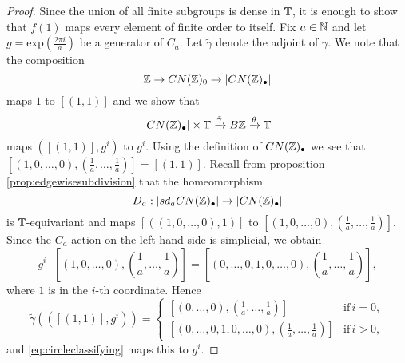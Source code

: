 \begin{proof}
Since the union of all finite subgroups is dense in $\mathbb{T}$, it is enough to
show that $f(1)$ maps every element of finite order to itself. Fix $a\in \mathbb{N}$
and let $g = \mathrm{exp}(\frac{2\pi i}{a} )$ be a generator of $C_a$. 
Let $\tilde \gamma$ denote the adjoint of $\gamma$. We 
note that the composition
\[\mathbb{Z}\to CN(\mathbb{Z})_0\to |CN(\mathbb{Z})_\bullet|
\]
 maps $1$ to $[(1,1)]$
and we show that
\[
|CN(\mathbb{Z})_\bullet|\times \mathbb{T}\xrightarrow{\tilde \gamma} B\mathbb{Z}\xrightarrow{\theta} \mathbb{T}
\]
maps $([(1,1)], g^i)$ to $g^i$.
Using the definition
of $CN(\mathbb{Z})_\bullet$ we see that $[(1,0,\ldots, 0),(\frac1a,\ldots, \frac1a)] = [(1,1)]$.
Recall from proposition \ref{prop:edgewisesubdivision} that the homeomorphism
\[
D_a:|sd_a CN(\mathbb{Z})_\bullet|\to | CN(\mathbb{Z})_\bullet|
\]
is $\mathbb{T}$-equivariant and maps $[((1,0,\ldots, 0),1)]$ to 
$[(1,0,\ldots, 0),(\frac1a,\ldots, \frac1a)]$.
Since the $C_a$ action on the left hand side is simplicial, we obtain
\[
g^i\cdot [(1,0,\ldots, 0),\left(\frac1a,\ldots, \frac1a\right)] 
= [(0,\ldots, 0,1,0,\ldots, 0),\left(\frac1a,\ldots, \frac1a\right)],
\]
where $1$ is in the $i$-th coordinate. Hence
\[
\tilde \gamma(([(1,1)], g^i)) = 
\begin{cases}
[(0,\ldots, 0),(\frac1a,\ldots, \frac1a)] &\mathrm{ if } \, i = 0,\\
[(0,\ldots, 0,1,0,\ldots, 0),(\frac1a,\ldots, \frac1a)] &\mathrm{ if }\, i > 0,
\end{cases}
\]
and \eqref{eq:circleclassifying} maps this to $g^i$.
\end{proof}


